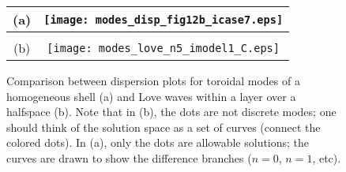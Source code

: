 \documentclass[11pt,titlepage,fleqn]{article}
\begin{document}




\clearpage\pagebreak
\begin{figure}
\centering
\begin{tabular}{cc}
(a) & \texttt{[image: modes\_disp\_fig12b\_icase7.eps]} \\ \hline
& \\
(b) & \texttt{[image: modes\_love\_n5\_imodel1\_C.eps]} 
\end{tabular}
\caption[]
{{
Comparison between dispersion plots for toroidal modes of a homogeneous shell (a) and Love waves within a layer over a halfspace (b). Note that in (b), the dots are not discrete modes; one should think of the solution space as a set of curves (\ie connect the colored dots). In (a), only the dots are allowable solutions; the curves are drawn to show the difference branches ($n=0$, $n=1$, etc).
\label{fig:dots}
}}
\end{figure}

\end{document}
